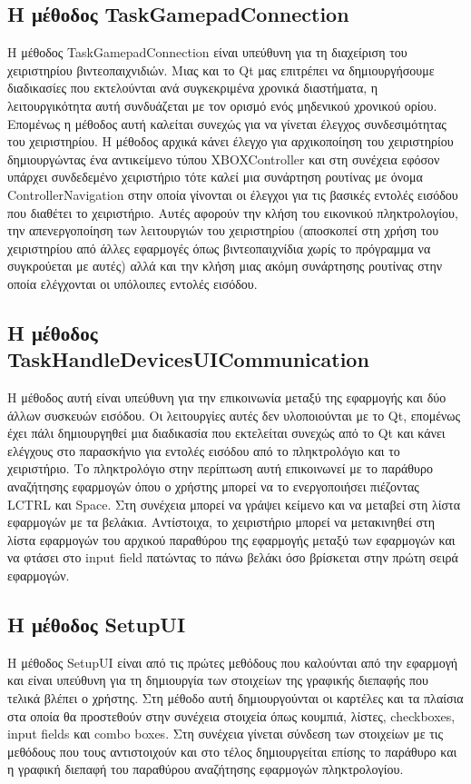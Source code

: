 \subsection{Η μέθοδος TaskGamepadConnection}
Η μέθοδος TaskGamepadConnection είναι υπεύθυνη για τη διαχείριση του χειριστηρίου βιντεοπαιχνιδιών. 
Μιας και το Qt μας επιτρέπει να δημιουργήσουμε διαδικασίες που εκτελούνται ανά συγκεκριμένα 
χρονικά διαστήματα, η λειτουργικότητα αυτή συνδυάζεται με τον ορισμό ενός μηδενικού χρονικού 
ορίου. Επομένως η μέθοδος αυτή καλείται συνεχώς για να γίνεται έλεγχος συνδεσιμότητας του
χειριστηρίου. Η μέθοδος αρχικά κάνει έλεγχο για αρχικοποίηση του χειριστηρίου δημιουργώντας ένα 
αντικείμενο τύπου XBOXController και στη συνέχεια εφόσον υπάρχει συνδεδεμένο χειριστήριο τότε 
καλεί μια συνάρτηση ρουτίνας με όνομα ControllerNavigation στην οποία γίνονται οι έλεγχοι για τις 
βασικές εντολές εισόδου που διαθέτει το χειριστήριο. Αυτές αφορούν την κλήση του εικονικού πληκτρολογίου, 
την απενεργοποίηση των λειτουργιών του χειριστηρίου (αποσκοπεί στη χρήση του χειριστηρίου από άλλες 
εφαρμογές όπως βιντεοπαιχνίδια χωρίς το πρόγραμμα να συγκρούεται με αυτές) αλλά και την κλήση μιας 
ακόμη συνάρτησης ρουτίνας στην οποία ελέγχονται οι υπόλοιπες εντολές εισόδου.




\subsection{Η μέθοδος TaskHandleDevicesUICommunication}
Η μέθοδος αυτή είναι υπεύθυνη για την επικοινωνία μεταξύ της εφαρμογής και δύο άλλων συσκευών εισόδου.
Οι λειτουργίες αυτές δεν υλοποιούνται με το Qt, επομένως έχει πάλι δημιουργηθεί μια διαδικασία που
εκτελείται συνεχώς από το Qt και κάνει ελέγχους στο παρασκήνιο για εντολές εισόδου από το πληκτρολόγιο
και το χειριστήριο. Το πληκτρολόγιο στην περίπτωση αυτή επικοινωνεί με το παράθυρο αναζήτησης εφαρμογών
όπου ο χρήστης μπορεί να το ενεργοποιήσει πιέζοντας LCTRL και Space. Στη συνέχεια μπορεί να γράψει κείμενο
και να μεταβεί στη λίστα εφαρμογών με τα βελάκια. Αντίστοιχα, το χειριστήριο μπορεί να μετακινηθεί στη λίστα εφαρμογών του
αρχικού παραθύρου της εφαρμογής μεταξύ των εφαρμογών και να φτάσει στο input field πατώντας
το πάνω βελάκι όσο βρίσκεται στην πρώτη σειρά εφαρμογών.


\subsection{Η μέθοδος SetupUI}
Η μέθοδος SetupUI είναι από τις πρώτες μεθόδους που καλούνται από την εφαρμογή και
είναι υπεύθυνη για τη δημιουργία των στοιχείων της γραφικής διεπαφής που τελικά
βλέπει ο χρήστης. Στη μέθοδο αυτή δημιουργούνται οι καρτέλες και τα πλαίσια στα
οποία θα προστεθούν στην συνέχεια στοιχεία όπως κουμπιά, λίστες, checkboxes, input
fields και combo boxes. Στη συνέχεια γίνεται σύνδεση των στοιχείων με τις μεθόδους
που τους αντιστοιχούν και στο τέλος δημιουργείται επίσης το παράθυρο και η γραφική
διεπαφή του παραθύρου αναζήτησης εφαρμογών πληκτρολογίου.



